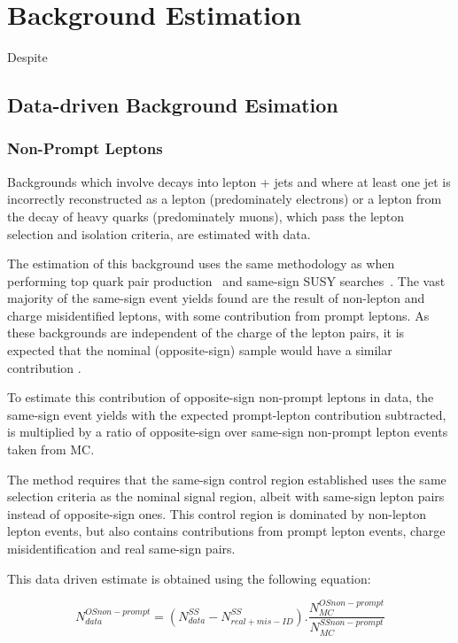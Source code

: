 \chapter{Background Estimation}\label{chapter:bkg}
Despite 

\section{Data-driven Background Esimation}\label{sec:dataDrivenBackground}
\subsection{Non-Prompt Leptons}\label{sec:NPLs}
Backgrounds which involve decays into lepton + jets and where at least one jet is incorrectly reconstructed as a lepton (predominately electrons) or a lepton from the decay of heavy quarks (predominately muons), which pass the lepton selection and isolation criteria, are estimated with data.

The estimation of this background uses the same methodology as when performing top quark pair production~\cite{CMS:2016syx} and same-sign SUSY searches~\cite{CMS:2015vqc}.
The vast majority of the same-sign event yields found are the result of non-lepton and charge misidentified leptons, with some contribution from prompt leptons.
As these backgrounds are independent of the charge of the lepton pairs, it is expected that the nominal (opposite-sign) sample would have a similar contribution \cite{CMS:2015vqc}.

To estimate this contribution of opposite-sign non-prompt leptons in data, the same-sign event yields with the expected prompt-lepton contribution subtracted, is multiplied by a ratio of opposite-sign over same-sign non-prompt lepton events taken from MC.

The method requires that the same-sign control region established uses the same selection criteria as the nominal signal region, albeit with same-sign lepton pairs instead of opposite-sign ones.
This control region is dominated by non-lepton lepton events, but also contains contributions from prompt lepton events, charge misidentification and real same-sign pairs.

This data driven estimate is obtained using the following equation:

\begin{equation}
 N_{data}^{OS non-prompt} = (N_{data}^{SS} - N^{SS}_{real + mis-ID}).\frac{N_{MC}^{OS non-prompt}}{N_{MC}^{SS non-prompt}}
\end{equation}

